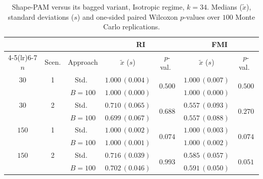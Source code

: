 \begin{table}[h]
\centering
\caption{Shape-PAM versus its bagged variant, Isotropic regime, $k=34$. Medians ($\tilde x$), standard deviations ($s$) and one-sided paired Wilcoxon $p$-values over $100$ Monte Carlo replications.}
\label{tab:pam-iso-k34}
\footnotesize
\begin{tabular}{cc c cc cc}
\toprule
& & & \multicolumn{2}{c}{\textbf{RI}} & \multicolumn{2}{c}{\textbf{FMI}} \\
\cmidrule(lr){4-5}\cmidrule(lr){6-7}
$n$ & Scen. & Approach & $\tilde x$ ($s$) & $p$-val.\ & $\tilde x$ ($s$) & $p$-val.\ \\
\midrule
$30$ & 1 & Std.\ & $1.000\,(0.004)$ & \multirow{2}{*}{$0.500$} & $1.000\,(0.007)$ & \multirow{2}{*}{$0.500$} \\
     &   & $B{=}100$ & $1.000\,(0.000)$ & & $1.000\,(0.000)$ & \\
$30$ & 2 & Std.\ & $0.710\,(0.065)$ & \multirow{2}{*}{$0.688$} & $0.557\,(0.093)$ & \multirow{2}{*}{$0.270$} \\
     &   & $B{=}100$ & $0.699\,(0.067)$ & & $0.557\,(0.088)$ & \\
$150$ & 1 & Std.\ & $1.000\,(0.002)$ & \multirow{2}{*}{$0.074$} & $1.000\,(0.003)$ & \multirow{2}{*}{$0.074$} \\
     &   & $B{=}100$ & $1.000\,(0.001)$ & & $1.000\,(0.002)$ & \\
$150$ & 2 & Std.\ & $0.716\,(0.039)$ & \multirow{2}{*}{$0.993$} & $0.585\,(0.057)$ & \multirow{2}{*}{$0.051$} \\
     &   & $B{=}100$ & $0.702\,(0.046)$ & & $0.591\,(0.050)$ & \\
\bottomrule
\end{tabular}
\end{table}

